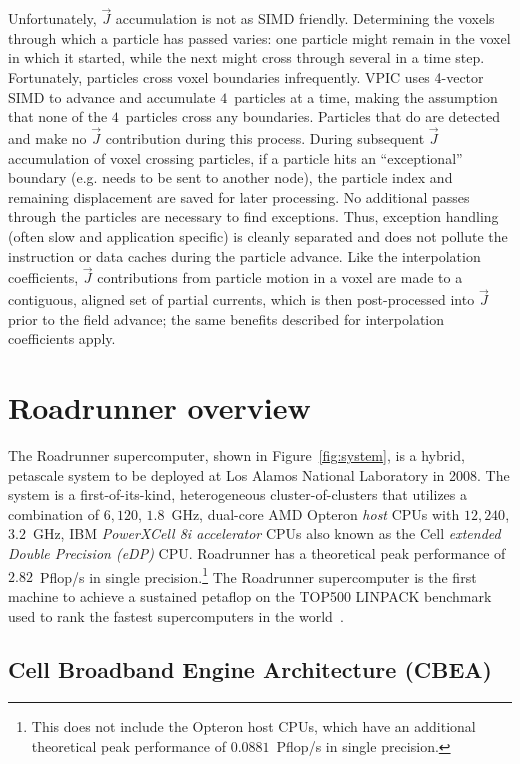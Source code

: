 \documentclass[journal,twoside]{IEEEtran}
\newcommand{\vecJ}{\vec{J}}
\newcommand{\fig}[1]{Figure~\ref{fig:#1}}
\begin{document}
Unfortunately, $\vecJ$ accumulation is not as SIMD friendly.
Determining the voxels through which a particle has passed varies: one
particle might remain in the voxel in which it started, while the next
might cross through several in a time step.  Fortunately, particles
cross voxel boundaries infrequently.  VPIC uses 4-vector SIMD to
advance and accumulate $4$~particles at a time, making the assumption that
none of the
$4$~particles cross any boundaries.  Particles that do are detected
and make no $\vecJ$ contribution during this process.  During
subsequent $\vecJ$ accumulation of voxel crossing particles, if a
particle hits an ``exceptional'' boundary (e.g. needs to be sent to
another node), the particle index and remaining displacement are saved
for later processing.  No additional passes through the particles are
necessary to find exceptions.  Thus, exception handling (often slow
and application specific) is cleanly separated and does not pollute
the instruction or data caches during the particle advance.  Like the
interpolation coefficients, $\vecJ$ contributions from particle motion
in a voxel are made to a contiguous, aligned set of partial currents,
which is then post-processed into $\vecJ$ prior to the field advance;
the same benefits described for interpolation coefficients apply.

\section{Roadrunner overview}

The Roadrunner supercomputer, shown in \fig{system}, is a hybrid,
petascale system to be deployed at Los Alamos National Laboratory in
2008.  The system is a first-of-its-kind, heterogeneous
cluster-of-clusters that utilizes a combination of $6,120$, $1.8$~GHz,
dual-core AMD Opteron \emph{host} CPUs with $12,240$, $3.2$~GHz, IBM
\emph{PowerXCell 8i accelerator} CPUs also known as the Cell
\emph{extended Double Precision (eDP)} CPU.  Roadrunner has a
theoretical peak performance of $2.82$~Pflop/s in single
precision.\footnote{This does not include the Opteron host CPUs, which
have an additional theoretical peak performance of $0.0881$~Pflop/s in
single precision.}  The Roadrunner supercomputer is the first machine
to achieve a sustained petaflop on the TOP500 LINPACK benchmark used
to rank the fastest supercomputers in the world~\cite{top500}.

\subsection{Cell Broadband Engine Architecture (CBEA)}
\end{document}
